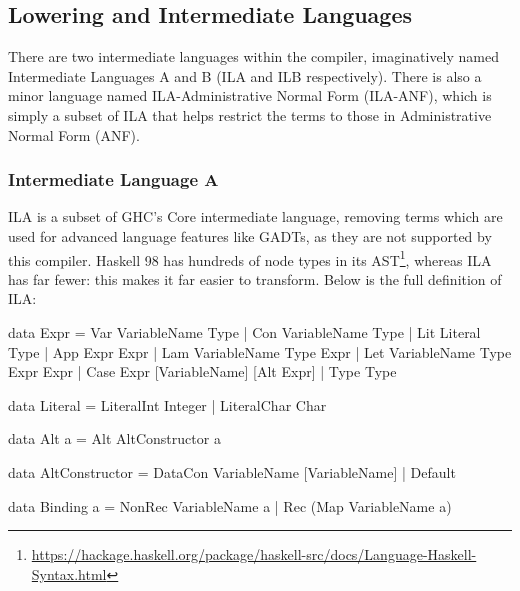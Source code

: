 \documentclass[dissertation.tex]{subfiles}
\begin{document}
{{{        }
    }
    \subsection{Lowering and Intermediate Languages}
    {

        There are two intermediate languages within the compiler, imaginatively named Intermediate Languages A and B
        (ILA and ILB respectively). There is also a minor language named ILA-Administrative Normal Form (ILA-ANF), which
        is simply a subset of ILA that helps restrict the terms to those in Administrative Normal Form (ANF).


        \subsubsection{Intermediate Language A}
        {

            ILA is a subset of GHC's Core intermediate language, removing terms which are used for advanced language
            features like GADTs, as they are not supported by this compiler. Haskell 98 has hundreds of node types in
            its
            AST\footnote{\url{https://hackage.haskell.org/package/haskell-src/docs/Language-Haskell-Syntax.html}}, whereas ILA has far fewer: this makes it far easier to transform. Below is the
            full definition of ILA:

            \begin{haskellfigure}
            data Expr = Var VariableName Type
                      | Con VariableName Type
                      | Lit Literal Type
                      | App Expr Expr
                      | Lam VariableName Type Expr
                      | Let VariableName Type Expr Expr
                      | Case Expr [VariableName] [Alt Expr]
                      | Type Type

            data Literal = LiteralInt Integer
                         | LiteralChar Char

            data Alt a = Alt AltConstructor a

            data AltConstructor = DataCon VariableName [VariableName]
                                | Default

            data Binding a = NonRec VariableName a
                           | Rec (Map VariableName a)
            \end{haskellfigure}

}}}
\end{document}
